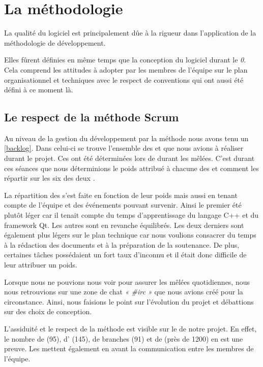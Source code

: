\section{La méthodologie}
La qualité du logiciel \FactDev{} est principalement dûe à la rigueur dans l'application de la méthodologie de développement. 

Elles fûrent définies en même temps que la conception du logiciel durant le \Sprint{} \textit{0}. Cela comprend les attitudes à adopter par les membres de l'équipe sur le plan organisationnel et techniques avec le respect de conventions qui ont aussi été défini à ce moment là.
 
\subsection{Le respect de la méthode Scrum}
Au niveau de la gestion du développement par la méthode \Scrum{} nous avons tenu un \Backlog{} \ref{backlog}. Dans celui-ci se trouve l'ensemble des \UserStories{} et\TechnicalStories{} que nous avions à réaliser durant le projet. Ces \Stories{} ont été déterminées lors de \PlanningPoker durant les mêlées. C'est durant ces séances que nous déterminions le poids attribué à chacune des \Stories{} et comment les répartir sur les six \Sprints{} des deux \Releases.  

La répartition des \Stories{} s'est faite en fonction de leur poids mais aussi en tenant compte de l'équipe et des événements pouvant survenir. Ainsi le premier \Sprint{} été plutôt léger car il tenait compte du temps d'apprentissage du langage C++ et du framework Qt. Les autres \Sprints{} sont en revanche équilibrés. Les deux derniers sont également plus légers sur le plan technique car nous voulions consacrer du temps à la rédaction des documents et à la préparation de la soutenance. De plus, certaines tâches possédaient un fort taux d'inconnu et il était donc difficile de leur attribuer un poids. 
  
Lorsque nous ne pouvions nous voir pour assurer les mêlées quotidiennes, nous nous retrouvions sur une zone  de chat \textit{« \#irc »} que nous avions créé pour la circonstance. Ainsi, nous faisions le point sur l'évolution du projet et débattions sur des choix de conception.

L'assiduité et le respect de la méthode \Scrum{} est visible sur le \Github{} de notre projet. En effet, le nombre de \PullRequest{} (95), d'\Issues{} (145), de branches (91) et de \Commits{} (près de 1200) en est une preuve. Les \PullRequest{} mettent également en avant la communication entre les membres de l'équipe.

